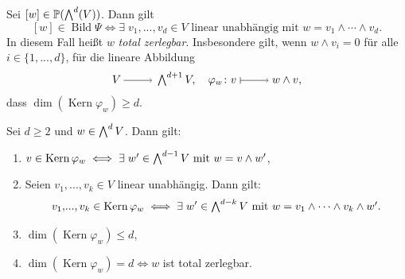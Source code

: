 \documentclass[a4paper,12pt,index=toc]{scrbook}
\theoremstyle{keinenummern} %
\def\P{\mathbb{P}}
\newcommand{\Kern}{\operatorname{Kern}}
\newcommand{\Bild}{\operatorname{Bild}}
\renewcommand{\dotsc}{\ensuremath{\!...}}
\let\grassmann\bigwedge
\def\bigwedge{\begingroup\textstyle\grassmann\endgroup}
\begin{document}
\begin{db}\label{2.7.2}
Sei $[w]\in\P(\bigwedge^{d}(V))$. Dann gilt
\[[w]\in\Bild\Psi\iff\exists\; v_{1},\dotsc,v_{d}\in V\text{ linear unabhängig mit }w=v_{1}\wedge\dotsm\wedge v_{d}.\]
In diesem Fall heißt $w$ \emph{total zerlegbar}. Insbesondere gilt, wenn $w\wedge v_{i}=0$ für alle $i\in\{1,\dotsc,d\}$, für die lineare Abbildung
\[V\ra\bigwedge^{d+1}V,\quad \varphi_{w}\colon v\mapsto w\wedge v,\]
dass $\dim(\Kern\varphi_{w})\geq d$.
\end{db}

\begin{lem}\label{2.7.3}
Sei $d\geq 2$ und $w\in\bigwedge^{d}V$. Dann gilt:
\begin{enumerate}
\item{} $v\in\Kern\varphi_{w}\iff\exists\; w'\in\bigwedge^{d-1}V\text{ mit }w=v\wedge w'$,
\item{} Seien $v_{1},\dotsc,v_{k}\in V$ linear unabhängig. Dann gilt:
\[v_{1},\dotsc,v_{k}\in\Kern\varphi_{w}\iff\exists\; w'\in\bigwedge^{d-k}V\text{ mit }w=v_{1}\wedge\dotsm\wedge v_{k}\wedge w'.\]
\item{} $\dim(\Kern\varphi_{w})\leq d$,
\item{} $\dim(\Kern\varphi_{w})=d\iff w$ ist total zerlegbar.
\end{enumerate}\end{lem}
\end{document}
